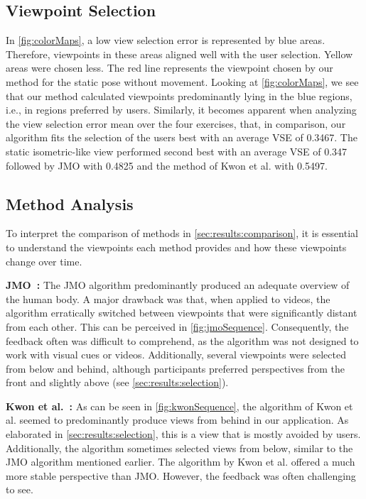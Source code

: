 \subsection{Viewpoint Selection \label{sec:results:selection}}
In \autoref{fig:colorMaps}, a low view selection error is represented by blue areas. Therefore, viewpoints in these areas aligned well with the user selection. Yellow areas were chosen less. The red line represents the viewpoint chosen by our method for the static pose without movement. Looking at \autoref{fig:colorMaps}, we see that our method calculated viewpoints predominantly lying in the blue regions, i.e., in regions preferred by users. Similarly, it becomes apparent when analyzing the view selection error mean over the four exercises, that, in comparison, our algorithm fits the selection of the users best with an average VSE of 0.3467. The static isometric-like view performed second best with an average VSE of 0.347 followed by JMO with 0.4825 and the method of Kwon et al. with 0.5497.

\subsection{Method Analysis\label{sec:results:analysis}}
To interpret the comparison of methods in \autoref{sec:results:comparison}, it is essential to understand the viewpoints each method provides and how these viewpoints change over time.

\textbf{JMO~\cite{ishara2015mra}:}
The JMO algorithm predominantly produced an adequate overview of the human body. A major drawback was that, when applied to videos, the algorithm erratically switched between viewpoints that were significantly distant from each other. This can be perceived in \autoref{fig:jmoSequence}. Consequently, the feedback often was difficult to comprehend, as the algorithm was not designed to work with visual cues or videos. Additionally, several viewpoints were selected from below and behind, although participants preferred perspectives from the front and slightly above (see \autoref{sec:results:selection}).

\textbf{Kwon et al.~\cite{kwon2020ocp}:} 
As can be seen in \autoref{fig:kwonSequence}, the algorithm of Kwon et al. seemed to predominantly produce views from behind in our application. As elaborated in \autoref{sec:results:selection}, this is a view that is mostly avoided by users. Additionally, the algorithm sometimes selected views from below, similar to the JMO algorithm mentioned earlier. The algorithm by Kwon et al. offered a much more stable perspective than JMO. However, the feedback was often challenging to see.

